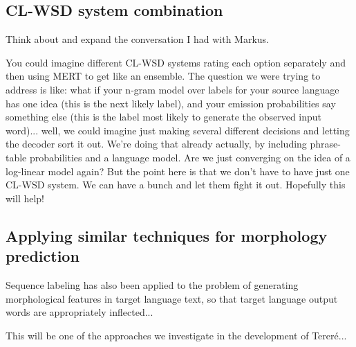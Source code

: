 \subsection{CL-WSD system combination}

Think about and expand the conversation I had with Markus.

You could imagine different CL-WSD systems rating each option separately and
then using MERT to get like an ensemble.
The question we were trying to address is like:
what if your n-gram model over labels for your source language has one idea
(this is the next likely label), and your emission probabilities say something
else (this is the label most likely to generate the observed input word)...
well, we could imagine just making several different decisions and letting the
decoder sort it out. We're doing that already actually, by including
phrase-table probabilities and a language model.
Are we just converging on the idea of a log-linear model again?
But the point here is that we don't have to have just one CL-WSD system. We can
have a bunch and let them fight it out. Hopefully this will help!

\subsection{Applying similar techniques for morphology prediction}

Sequence labeling has also been applied to the problem of generating
morphological features in target language text, so that target language output
words are appropriately inflected...
\cite{toutanova-suzuki-ruopp:2008:ACLMain}

This will be one of the approaches we investigate in the development of
Tereré...

